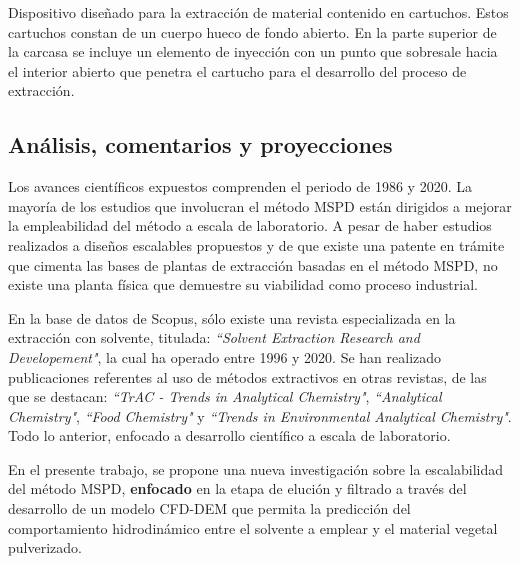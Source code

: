 \noindent
\justify

Dispositivo dise\~nado para la extracci\'on de material contenido en cartuchos. Estos cartuchos constan de un cuerpo hueco de fondo abierto. En la parte superior de la carcasa se incluye un elemento de inyecci\'on con un punto que sobresale hacia el interior abierto que penetra el cartucho para el desarrollo del proceso de extracci\'on. 

\subsection{An\'alisis, comentarios y proyecciones}

\noindent
\justify

Los avances cient\'ificos expuestos comprenden el periodo de 1986 y 2020. La mayor\'ia de los estudios que involucran el m\'etodo MSPD est\'an dirigidos a mejorar la empleabilidad del m\'etodo a escala de laboratorio. A pesar de haber estudios realizados a dise\~nos escalables propuestos y de que existe una patente en tr\'amite que cimenta las bases de plantas de extracci\'on basadas en el m\'etodo MSPD, no existe una planta f\'isica que demuestre su viabilidad como proceso industrial. 

\noindent
\justify

En la base de datos de Scopus, s\'olo existe una revista especializada en la extracci\'on con solvente, titulada: \textit{``Solvent Extraction Research and Developement"}, la cual ha operado entre 1996 y 2020. Se han realizado publicaciones referentes al uso de m\'etodos extractivos en otras revistas, de las que se destacan: \textit{``TrAC - Trends in Analytical Chemistry"}, \textit{``Analytical Chemistry"}, \textit{``Food Chemistry"} y \textit{``Trends in Environmental Analytical Chemistry"}. Todo lo anterior, enfocado a desarrollo cient\'ifico a escala de laboratorio. 

\noindent
\justify

En el presente trabajo, se propone una nueva investigaci\'on sobre la escalabilidad del m\'etodo MSPD, \textbf{enfocado} en la etapa de eluci\'on y filtrado a trav\'es del desarrollo de un modelo CFD-DEM que permita la predicci\'on del comportamiento hidrodin\'amico entre el solvente a emplear y el material vegetal pulverizado.